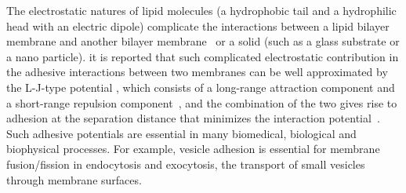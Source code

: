 \documentclass[prf,superscriptaddress,showpacs]{revtex4-1}
\begin{document}
%
The electrostatic
natures of lipid molecules (a hydrophobic tail and a hydrophilic head
with an electric dipole) complicate the interactions between a lipid
bilayer membrane and another bilayer
membrane~\cite{EvansMetcalfe1984_BJ, Book_PhysicalBasisCellAdhesion,Book_IntermolecularSurfaceForces,PerutkovaFrank-Bertoncelij2013_CSB} 
or a solid (such as a glass substrate
or a nano particle).  it is reported that such complicated electrostatic contribution in the adhesive interactions between two membranes can be well approximated by the 
L-J-type potential \cite{FlormannAouane2017_SciReports}, which consists of a long-range attraction component and a
short-range repulsion component~\cite{Book_IntermolecularSurfaceForces},
and the combination of the two gives rise to adhesion at the separation
distance that minimizes the interaction
potential~\cite{Book_IntermolecularSurfaceForces}. Such adhesive
potentials are essential in many biomedical, biological and biophysical
processes.  For example, vesicle adhesion is essential for membrane
fusion/fission in endocytosis and exocytosis, the transport of small
vesicles through membrane surfaces.
\end{document}
